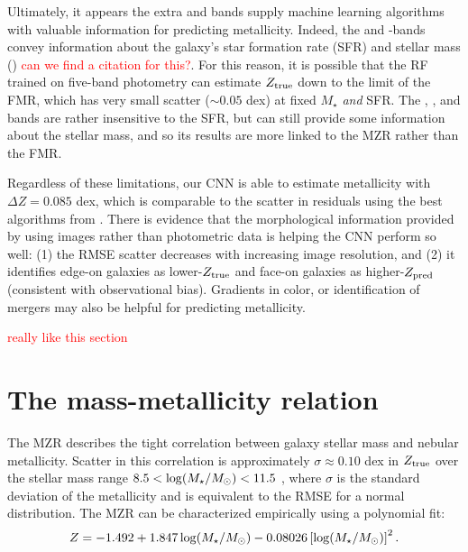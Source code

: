 \documentclass[fleqn,usenatbib]{mnras}
\newcommand{\editorial}[1]{\textcolor{red}{#1}}
\begin{document}
Ultimately, it appears the extra \sdssu{} and \sdssz{} bands supply machine learning algorithms with valuable information for predicting metallicity. %
Indeed, the \sdssu{} and \sdssz-bands convey information about the galaxy's star formation rate (SFR) and stellar mass (\mstar) \editorial{can we find a citation for this?}. For this reason, it is possible that the RF trained on five-band photometry can estimate $Z_{\rm true}$ down to the limit of the FMR, which has very small scatter ($\sim 0.05$ dex) at fixed $M_{\star}$ \textit{and} SFR. The \sdssg{}, \sdssr{}, and \sdssi{} bands are rather insensitive to the SFR, but can still provide some information about the stellar mass, and so its results are more linked to the MZR rather than the FMR.

Regardless of these limitations, our CNN is able to estimate metallicity with $\Delta Z = 0.085$ dex, which is comparable to the scatter in residuals using the best algorithms from \cite{Acquaviva2016}. There is evidence that the morphological information provided by using images rather than photometric data is helping the CNN perform so well: (1) the RMSE scatter decreases with increasing image resolution, and (2) it identifies edge-on galaxies as lower-$Z_{\rm true}$ and face-on galaxies as higher-$Z_{\rm pred}$ (consistent with observational bias). Gradients in color, or identification of mergers  may also be helpful for predicting metallicity.

\editorial{really like this section}

\section{The mass-metallicity relation} \label{sec:MZR}
The MZR describes the tight correlation between galaxy stellar mass and nebular metallicity. Scatter in this correlation is approximately $\sigma \approx 0.10$ dex in $Z_{\rm true}$ over the stellar mass range $8.5 < \log (\hbox{$M_{\star}$} / \hbox{$M_\odot$}) < 11.5$ \citep{Tremonti2004}, where $\sigma$ is the standard deviation of the metallicity and is equivalent to the RMSE for a normal distribution. The MZR can be characterized empirically using a polynomial fit:
\begin{equation}\label{eq:mzr}
Z = -1.492 + 1.847 \log (\hbox{$M_{\star}$} / \hbox{$M_\odot$}) - 0.08026 \left [\log(\hbox{$M_{\star}$} / \hbox{$M_\odot$})\right ]^2.
\end{equation}
\end{document}
